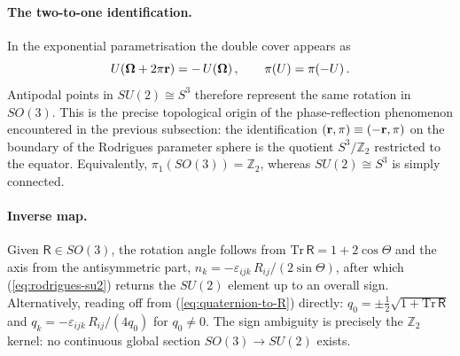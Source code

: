 \documentclass[journal]{IEEEtran}
\newcommand{\bfOmega}{\boldsymbol{\Omega}}
\newcommand{\beq}{\begin{equation}}
\newcommand{\eeq}{\end{equation}}
\begin{document}
\paragraph{The two-to-one identification.}
In the exponential parametrisation the double cover appears as
\beq
   U(\bfOmega + 2\pi{\bf r}) = -\,U(\bfOmega)\,,\qquad
   \pi(U) = \pi(-U)\,.
\eeq
Antipodal points in $SU(2)\cong S^3$ therefore represent the same rotation
in $SO(3)$. This is the precise topological origin of the
phase-reflection phenomenon encountered in the previous subsection:
the identification $({\bf r},\pi) \equiv (-{\bf r},\pi)$ on the boundary
of the Rodrigues parameter sphere is the quotient $S^3/\mathbb{Z}_2$
restricted to the equator. Equivalently,
$\pi_1(SO(3)) = \mathbb{Z}_2$, whereas $SU(2)\cong S^3$ is simply connected.

\paragraph{Inverse map.}
Given $\mathsf{R}\in SO(3)$, the rotation angle follows from $\mathrm{Tr}\,\mathsf{R} = 1 + 2\cos\Theta$
and the axis from the antisymmetric part,
$n_k = -\varepsilon_{ijk}\,R_{ij}/(2\sin\Theta)$, after which (\ref{eq:rodrigues-su2})
returns the $SU(2)$ element up to an overall sign.
Alternatively, reading off from (\ref{eq:quaternion-to-R}) directly:
$q_0 = \pm\tfrac{1}{2}\sqrt{1+\mathrm{Tr}\,\mathsf{R}}$ and
$q_k = -\varepsilon_{ijk}\,R_{ij}/(4q_0)$ for $q_0\neq 0$.
The sign ambiguity is precisely the $\mathbb{Z}_2$ kernel: no continuous global
section $SO(3)\to SU(2)$ exists.

\end{document}
